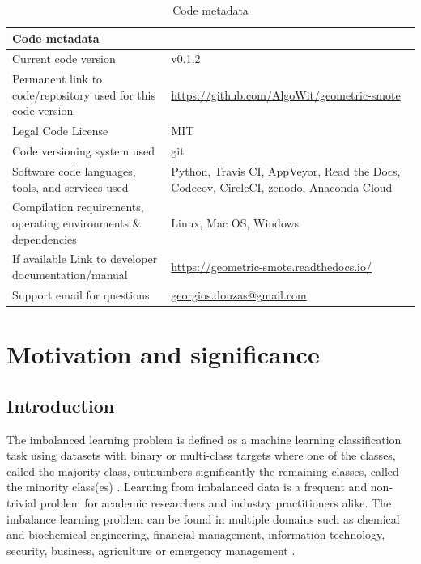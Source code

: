 \documentclass[preprint,12pt, a4paper]{elsarticle}
\begin{document}
\begin{table}[H]
\begin{tabular}{|p{6.5cm}|p{6.5cm}|}
\hline
Code metadata & \\
\hline
Current code version & v0.1.2 \\
\hline
Permanent link to code/repository used for this code version & \url{https://github.com/AlgoWit/geometric-smote} \\
\hline
Legal Code License & MIT \\
\hline
Code versioning system used & git \\
\hline
Software code languages, tools, and services used & Python, Travis CI, AppVeyor, Read the Docs, Codecov, CircleCI, zenodo, Anaconda Cloud \\
\hline
Compilation requirements, operating environments \& dependencies & Linux, Mac OS, Windows \\
\hline
If available Link to developer documentation/manual & \url{https://geometric-smote.readthedocs.io/} \\
\hline
Support email for questions & \href{mailto:georgios.douzas@gmail.com}{georgios.douzas@gmail.com} \\
\hline
\end{tabular}
\caption{Code metadata}
\label{} 
\end{table}

\linenumbers


\section{Motivation and significance}
\label{motivation}

\subsection{Introduction}
\label{introduction}

The imbalanced learning problem is defined as a machine learning classification task using datasets with binary or multi-class targets where one of the classes, called the majority class, outnumbers significantly the remaining classes, called the minority class(es) \cite{Chawla2003}. Learning from imbalanced data is a frequent and non-trivial problem for academic researchers and industry practitioners alike. The imbalance learning problem can be found in multiple domains such as chemical and biochemical engineering, financial management, information technology, security, business, agriculture or emergency management \cite{Haixiang2017}.
\end{document}
